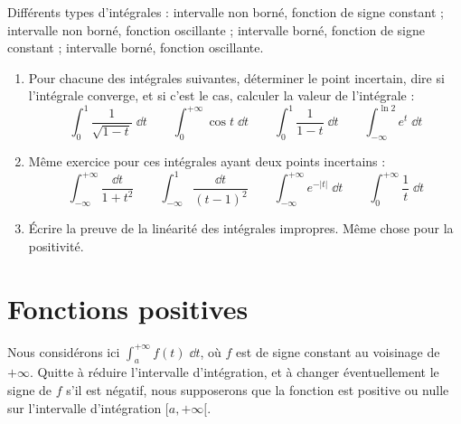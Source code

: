 \documentclass[class=report,crop=false]{standalone}
\begin{document}

Différents types d'intégrales :
 intervalle non borné, fonction de signe constant ;
 intervalle non borné, fonction oscillante ;
 intervalle borné, fonction de signe constant ;
 intervalle borné, fonction oscillante.




\begin{miniexercices}
\begin{enumerate}
  \item Pour chacune des intégrales suivantes, déterminer le point incertain, dire
  si l'intégrale converge, et si c'est le cas, calculer la valeur de l'intégrale :
  $$
  \int_0^1 \frac{1}{\sqrt {1-t}} \;\dd t \qquad
  \int_0^{+\infty}\cos t \;\dd t \qquad
  \int_0^1 \frac{1}{1-t} \;\dd t \qquad
  \int_{-\infty}^{\ln 2} e^t \;\dd t
  $$
  
  \item Même exercice pour ces intégrales ayant deux points incertains :
  $$
  \int_{-\infty}^{+\infty} \frac{\dd t}{1+t^2} \qquad
  \int_{-\infty}^{1} \frac{\dd t}{(t-1)^2} \qquad
  \int_{-\infty}^{+\infty} e^{-|t|}\;\dd t \qquad
  \int_0^{+\infty} \frac1t \;\dd t$$
  
   \item \'Ecrire la preuve de la linéarité des intégrales impropres. Même chose 
   pour la positivité.
   
\end{enumerate}
\end{miniexercices}



\section{Fonctions positives}


Nous considérons ici $\int_a^{+\infty} f(t)\;\dd t$, où $f$ est de
signe constant au voisinage de $+\infty$. Quitte à réduire
l'intervalle d'intégration, et à changer éventuellement le signe
de $f$ s'il est négatif, 
nous supposerons que la fonction est positive ou
nulle sur l'intervalle d'intégration $[a,+\infty[$.
\end{document}
